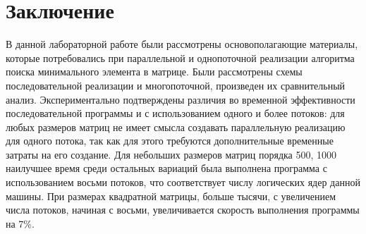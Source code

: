 \chapter*{Заключение}
В данной лабораторной работе были рассмотрены основополагающие материалы, которые потребовались при параллельной и однопоточной реализации алгоритма поиска минимального элемента в матрице. Были рассмотрены схемы последовательной реализации и многопоточной, произведен их сравнительный анализ. Экспериментально подтверждены различия во временной эффективности последовательной программы и с использованием одного и более потоков: для любых размеров матриц не имеет смысла создавать параллельную реализацию для одного потока, так как для этого требуются дополнительные временные затраты на его создание. Для небольших размеров матриц порядка 500, 1000 наилучшее время среди остальных вариаций была выполнена программа с использованием восьми потоков, что соответствует числу логических ядер данной машины. При размерах квадратной матрицы, больше тысячи, с увеличением числа потоков, начиная с восьми, увеличивается скорость выполнения программы на 7\%.